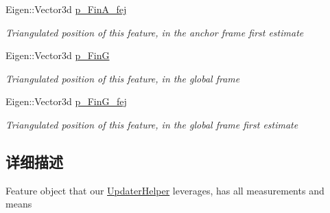 \begin{DoxyCompactItemize}
\mbox{\label{structov__msckf_1_1UpdaterHelper_1_1UpdaterHelperFeature_a0558ee91d9c7e0929a10b5b4f4946f02}} 
Eigen\+::\+Vector3d \hyperlink{structov__msckf_1_1UpdaterHelper_1_1UpdaterHelperFeature_a0558ee91d9c7e0929a10b5b4f4946f02}{p\+\_\+\+Fin\+A\+\_\+fej}
\begin{DoxyCompactList}\small\item\em Triangulated position of this feature, in the anchor frame first estimate \end{DoxyCompactList}\item 
\mbox{\label{structov__msckf_1_1UpdaterHelper_1_1UpdaterHelperFeature_a3969fdadac10a9873ce77468ed4b68b4}} 
Eigen\+::\+Vector3d \hyperlink{structov__msckf_1_1UpdaterHelper_1_1UpdaterHelperFeature_a3969fdadac10a9873ce77468ed4b68b4}{p\+\_\+\+FinG}
\begin{DoxyCompactList}\small\item\em Triangulated position of this feature, in the global frame \end{DoxyCompactList}\item 
\mbox{\label{structov__msckf_1_1UpdaterHelper_1_1UpdaterHelperFeature_a683f5e77e259db6e9fe564c8f68b7733}} 
Eigen\+::\+Vector3d \hyperlink{structov__msckf_1_1UpdaterHelper_1_1UpdaterHelperFeature_a683f5e77e259db6e9fe564c8f68b7733}{p\+\_\+\+Fin\+G\+\_\+fej}
\begin{DoxyCompactList}\small\item\em Triangulated position of this feature, in the global frame first estimate \end{DoxyCompactList}\end{DoxyCompactItemize}


\subsection{详细描述}
Feature object that our \hyperlink{classov__msckf_1_1UpdaterHelper}{Updater\+Helper} leverages, has all measurements and means 
